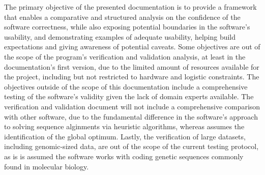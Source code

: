 \documentclass[12pt, titlepage]{article}
\begin{document}
The primary objective of the presented documentation is to provide a framework that 
enables a comparative and structured analysis on the confidence of the \progname{} software 
correctness, while also exposing potential boundaries in the software's usability, and 
demonstrating examples of adequate usability, helping build expectations and giving 
awareness of potential caveats.
Some objectives are out of the scope of the program's verification and validation analysis, at least 
in the documentation's first version, due to the limited amount of resources available for the project, 
including but not restricted to hardware and logistic constraints. The objectives outside of the scope 
of this documentation include a comprehensive testing of the software's validity given the lack of 
domain experts available. The verification and validation document will not include a comprehensive 
comparison with other software, due to the fundamental difference in the software's approach to
solving sequence alginments via heuristic algorithms, whereas \progname{} assumes the identification of the 
global optimum. Lastly, the verification of large datasets, including genomic-sized data, are out of the 
scope of the current testing protocol, as is is assumed the software works with coding genetic sequences 
commonly found in molecular biology.




\end{document}
